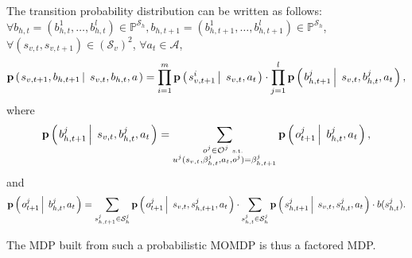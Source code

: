 \begin{theorem}
The transition probability distribution can be written as follows:
$\forall b_{h,t}=(b^1_{h,t},\ldots,b^l_{h,t}) \in \mathbb{P}^{\mathcal{S}_h}, 
b_{h,t+1} = (b^1_{h,t+1},\ldots,b^l_{h,t+1}) \in  \mathbb{P}^{\mathcal{S}_h}$, 
$\forall (s_{v,t},s_{v,t+1}) \in (\mathcal{S}_v)^2$, 
$\forall a_t \in \mathcal{A}$, 
\[ \textbf{p} \left( \left.  s_{v,t+1}, b_{h,t+1} \, \right| \left. \, s_{v,t}, b_{h,t}, a  \right. \right)  = \displaystyle  \prod_{i=1}^{m} \textbf{p} \left( \left.  s^i_{v,t+1} \, \right| \left. \, s_{v,t}, a_t  \right. \right) \cdot  \prod_{j=1}^{l} \textbf{p} \left( \left.  b^j_{h,t+1} \, \right| \left. \, s_{v,t}, b^j_{h,t}, a_t   \right. \right) , \]
where 
\[ \displaystyle \textbf{p} \left( \left.  b^j_{h,t+1} \, \right| \left. \, s_{v,t}, b^j_{h,t}, a_t   \right. \right) 
= \sum_{\substack{ o^j \in \mathcal{O}^j \mbox{ \tiny s.t. } \\ u^j(s_{v,t},\beta^j_{h,t},a_t,o^j) = \beta^j_{h,t+1}}} \textbf{p} \left( \left.  o^j_{t+1} \, \right| \left. \, b^j_{h,t}, a_t  \right. \right),\]
and 
\[ \textbf{p} \left( \left.  o^j_{t+1} \, \right| \left. \, b^j_{h,t}, a_t  \right. \right) = \sum_{s^j_{h,t+1} \in \mathcal{S}^j_h} \textbf{p} \left( \left.  o^j_{t+1} \, \right| \left. \, s_{v,t}, s^j_{h,t+1}, a_t  \right. \right) \cdot 
\sum_{s^j_{h,t} \in \mathcal{S}_h^j} \textbf{p} \left( \left.  s^j_{h,t+1} \, \right| \left. \, s_{v,t}, s^j_{h,t}, a_t  \right. \right) \cdot b(s^j_{h,t}). \]
\end{theorem}
The MDP built from such a probabilistic MOMDP is thus a factored MDP.

